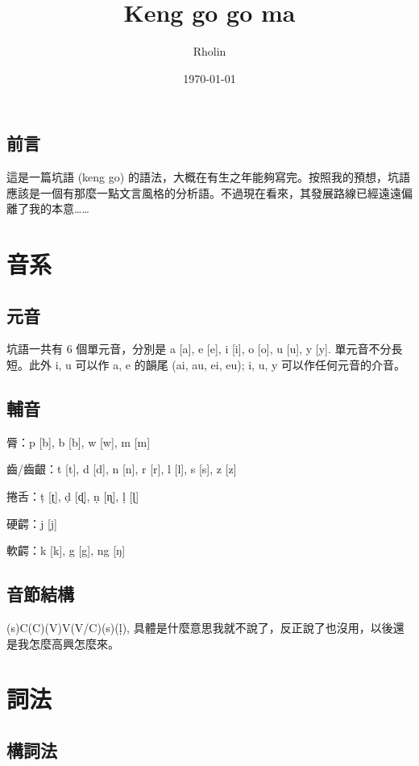 \documentclass[UTF8]{ctexbook}
\title{Keng go go ma}
\author{Rholin}
\date{\today}
\begin{document}
\maketitle

\section{前言}
這是一篇坑語 (keng go) 的語法，大概在有生之年能夠寫完。按照我的預想，坑語應該是一個有那麼一點文言風格的分析語。不過現在看來，其發展路線已經遠遠偏離了我的本意……

\chapter{音系}
\section{元音}
坑語一共有 6 個單元音，分別是 a [a], e [e], i [i], o [o], u [u], y [y]. 單元音不分長短。此外 i, u 可以作 a, e 的韻尾 (ai, au, ei, eu); i, u, y 可以作任何元音的介音。

\section{輔音}
脣：p [b], b [b], w [w], m [m] \par
齒/齒齦：t [t], d [d], n [n], r [r], l [l], s [s], z [z] \par
捲舌：ṭ [ʈ], ḍ [ɖ], ṇ [ɳ], ḷ [ɭ] \par
硬齶：j [j] \par
軟齶：k [k], g [g], ng [ŋ] \par

\section{音節結構}
(s)C(C)(V)V(V/C)(s)(ḷ), 具體是什麼意思我就不說了，反正說了也沒用，以後還是我怎麼高興怎麼來。

\chapter{詞法}
\section{構詞法}
\end{document}
